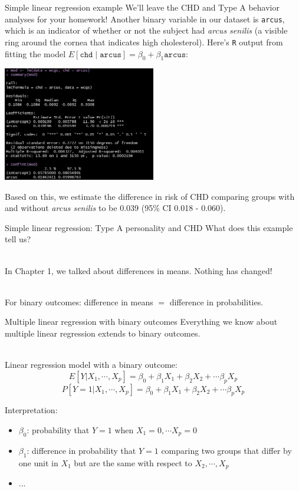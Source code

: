 \documentclass[10pt,t]{beamer}
\begin{document}
\begin{frame}{Simple linear regression example}
	\vspace{-0.8cm}
	We'll leave the CHD and Type A behavior analyses for your homework! Another binary variable in our dataset is \texttt{arcus}, which is an indicator of whether or not the subject had \textit{arcus senilis} (a visible ring around the cornea that indicates high cholesterol). Here's \texttt{R} output from fitting the model $E[\texttt{chd} \mid \texttt{arcus}] = \beta_0 + \beta_1 \texttt{arcus}$:
	
	\begin{center}
		\includegraphics[width=0.5\textwidth]{./figs/simple_linear_regression_arcus}
	\end{center}

	Based on this, we estimate the difference in risk of CHD comparing groups with and without \textit{arcus senilis} to be 0.039 (95\% CI 0.018 - 0.060). 
	
\end{frame}

\begin{frame}{Simple linear regression: Type A personality and CHD}
	What does this example tell us? 
	\\ ~\
	
	In Chapter 1, we talked about differences in means. Nothing has changed!
	\\ ~\

	For binary outcomes: difference in means $=$ difference in probabilities.
\end{frame}

\begin{frame}{Multiple linear regression with binary outcomes}
	Everything we know about multiple linear regression extends to binary outcomes. 
	\\ ~\
	
	Linear regression model with a binary outcome: $$E[Y|X_1,\cdots,X_p] = \beta_0 + \beta_1 X_1 + \beta_2X_2 + \cdots \beta_p X_p$$ $$P[Y=1|X_1,\cdots,X_p] = \beta_0 + \beta_1 X_1 + \beta_2 X_2 + \cdots \beta_p X_p$$
	
	\color{blue} Interpretation: \color{black}
	\begin{itemize} 
		\item $\beta_0$: \pause probability that $Y=1$ when $X_1 = 0, \cdots X_p = 0$
		\item $\beta_1$: \pause difference in probability that $Y=1$ comparing two groups that differ by one unit in $X_1$ but are the same with respect to $X_2,\cdots,X_p$ 
		\item ...
	\end{itemize}
\end{frame}
\end{document}
